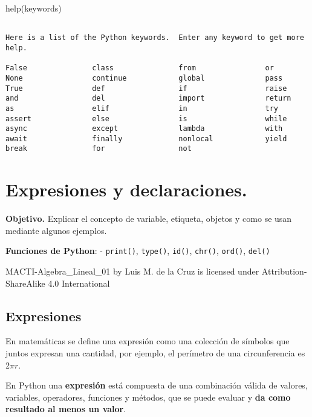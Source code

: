 \documentclass[
  letterpaper,
  DIV=11,
  numbers=noendperiod]{scrreprt}
\newenvironment{Shaded}{\begin{snugshade}}{\end{snugshade}}
\newcommand{\BuiltInTok}[1]{\textcolor[rgb]{0.00,0.23,0.31}{#1}}
\newcommand{\NormalTok}[1]{\textcolor[rgb]{0.00,0.23,0.31}{#1}}
\newcommand{\StringTok}[1]{\textcolor[rgb]{0.13,0.47,0.30}{#1}}
\begin{document}
\begin{Shaded}
\begin{Highlighting}[]
\BuiltInTok{help}\NormalTok{(}\StringTok{\textquotesingle{}keywords\textquotesingle{}}\NormalTok{)}
\end{Highlighting}
\end{Shaded}

\begin{verbatim}

Here is a list of the Python keywords.  Enter any keyword to get more help.

False               class               from                or
None                continue            global              pass
True                def                 if                  raise
and                 del                 import              return
as                  elif                in                  try
assert              else                is                  while
async               except              lambda              with
await               finally             nonlocal            yield
break               for                 not                 
\end{verbatim}


\chapter{Expresiones y
declaraciones.}\label{expresiones-y-declaraciones.}

\textbf{Objetivo.} Explicar el concepto de variable, etiqueta, objetos y
como se usan mediante algunos ejemplos.

\textbf{Funciones de Python}: - \texttt{print()}, \texttt{type()},
\texttt{id()}, \texttt{chr()}, \texttt{ord()}, \texttt{del()}

MACTI-Algebra\_Lineal\_01 by Luis M. de la Cruz is licensed under
Attribution-ShareAlike 4.0 International

\section{Expresiones}\label{expresiones}

En matemáticas se define una expresión como una colección de símbolos
que juntos expresan una cantidad, por ejemplo, el perímetro de una
circunferencia es 2\(\pi r\).

En Python una \textbf{expresión} está compuesta de una combinación
válida de valores, variables, operadores, funciones y métodos, que se
puede evaluar y \textbf{da como resultado al menos un valor}.
\end{document}
